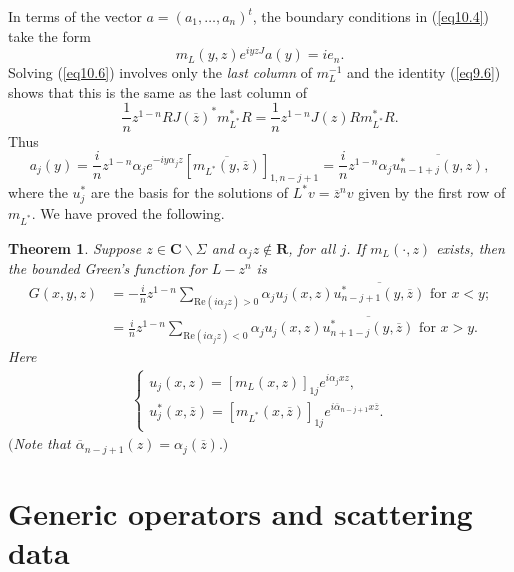 \documentclass{surv-l}
\theoremstyle{plain}
\newtheorem{theorem}{Theorem}[section]
\theoremstyle{definition}
\numberwithin{equation}{chapter}
\begin{document}
In terms of the vector $a = (a_{1},\ldots, a_{n})^{t}$, the boundary conditions in (\ref{eq10.4}) take the form
\begin{equation}\label{eq10.6}
m_{L}(y, z)e^{iyzJ}a(y)=ie_{n}.
\end{equation}
Solving (\ref{eq10.6}) involves only the  \emph{last column} of $m_{L}^{-1}$ and the identity (\ref{eq9.6}) shows that this is the same as the last column of
\begin{equation*}
\frac{1}{n}z^{1-n}RJ(\overline{z})^{*}m_{L^{*}}^{*}R=\frac{1}{n}z^{1-n}J(z)Rm_{L^{*}}^{*}R.
\end{equation*}
Thus
\begin{equation*}
a_{j}(y)=\frac{i}{n}z^{1-n}\alpha_{j}e^{-iy\alpha_{j}z}[\overline{m_{L^{*}}(y,\overline{z})}]_{1,n-j+1}=\frac{i}{n}
z^{1-n}\alpha_{j}\overline{u_{n-1+j}^{*}(y,z)},
\end{equation*}
where the $u_{j}^{*}$ are the basis for the solutions of $L^{*}v=\overline{z}^{n}v$ given by the first row of $ m_{L^{*}}$. We have proved the following.
\setcounter{theorem}{6}
\begin{theorem}\label{thm10.7} Suppose $ z\in \mathbf{C}\backslash \Sigma$ and $\alpha_{j}z\not\in \mathbf{R}$, for all $j$. If $m_{L}(\cdot,z)$ exists, then the bounded Green's function for $L-z^{n}$ is
\setcounter{equation}{7}
\begin{align}\label{eq10.8}
G(x, y, z)&=-\frac{i}{n}z^{1-n}\sum_{\mathrm{Re}(i\alpha_{j}z)>0}\alpha_{j}u_{j}(x, z)\overline{u_{n-j+1}^{*}(y,\overline{z})} \text{ for } x<y;\\ \nonumber
&=\frac{i}{n}z^{1-n}\sum_{\mathrm{Re}(i\alpha_{j}z)<0}\alpha_{j}u_{j}(x, z)\overline{u_{n+1-j}^{*}(y,\overline{z})} \text{ for } x>y.
\end{align}
Here
\begin{align}\label{eq10.9}
\left\{\begin{array}{l}
u_{j}(x, z)=[m_{L}(x, z)]_{1j}e^{i\alpha_{j}xz},\\
u_{j}^{*}(x, \overline{z})=[m_{L^{*}}(x, \overline{z})]_{1j}e^{i\overline{\alpha}_{n-j+1}x\overline{z}}.
\end{array}\right.
\end{align}
$($Note that $\overline{\alpha}_{n-j+1}(z) =\alpha_{j}(\overline{z}).)$
\end{theorem}

\section{Generic operators and scattering data}\label{sec11}
\end{document}
